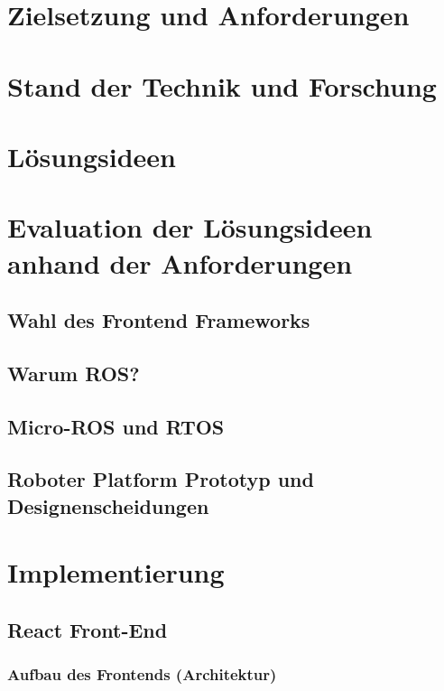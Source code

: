 \documentclass[11pt,twoside,a4paper,titlepage]{article}
\begin{document}
\section{Zielsetzung und Anforderungen}


\section{Stand der Technik und Forschung}


\section{Lösungsideen}


\section{Evaluation der Lösungsideen anhand der Anforderungen}

\subsection{Wahl des Frontend Frameworks}


\subsection{Warum ROS?}


\subsection{Micro-ROS und RTOS}



\subsection{Roboter Platform Prototyp und Designenscheidungen}


\section{Implementierung}

\subsection{React Front-End}
\subsubsection{Aufbau des Frontends (Architektur)}

\end{document}
